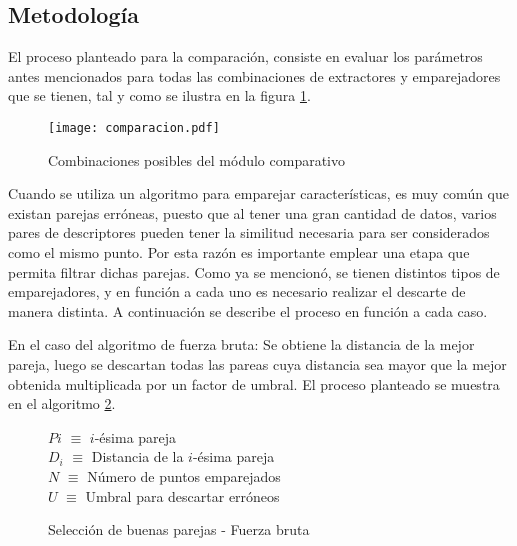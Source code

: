 \subsection{Metodología}

El proceso planteado para la comparación, consiste en evaluar los parámetros antes mencionados para todas las combinaciones de extractores y emparejadores que se tienen, tal y como se ilustra en la figura \ref{imagen:comparacion}.

\begin{figure}[H]
	\centering
	\texttt{[image: comparacion.pdf]}
	\caption[Combinación de algoritmos para el analisis de rendimiento]{Combinaciones posibles del módulo comparativo}
	\label{imagen:comparacion}
\end{figure}

Cuando se utiliza un algoritmo para emparejar características, es muy común que existan parejas erróneas, puesto que al tener una gran cantidad de datos, varios pares de descriptores pueden tener la similitud necesaria para ser considerados como el mismo punto. Por esta razón es importante emplear una etapa que permita filtrar dichas parejas. Como ya se mencionó, se tienen distintos tipos de emparejadores, y en función a cada uno es necesario realizar el descarte de manera distinta. A continuación se describe el proceso en función a cada caso.

En el caso del algoritmo de fuerza bruta: Se obtiene la distancia de la mejor pareja, luego se descartan todas las pareas cuya distancia sea mayor que la mejor obtenida multiplicada por un factor de umbral. El proceso planteado se muestra en el algoritmo \ref{fuerzabruta}.

\begin{figure}[h]
	\centering
	\begin{minipage}{.7\linewidth}
		\begin{algorithm}[H] %
			\caption{Selección de buenas parejas - Fuerza bruta}
			\label{fuerzabruta}
			\SetAlgoLined
			$P{i}$ $\equiv$  $i$-ésima pareja\\
			$D_{i}$ $\equiv$ Distancia de la $i$-ésima pareja\\
			$N$ $\equiv$ Número de puntos emparejados\\
			$U$ $\equiv$ Umbral para descartar erróneos\\
		\end{algorithm}
	\end{minipage}
\end{figure}

